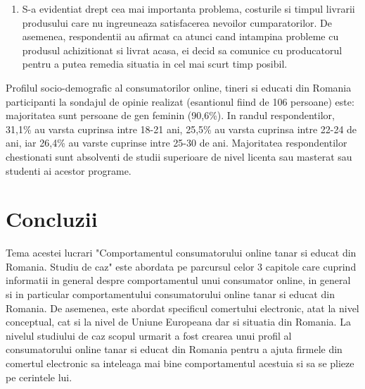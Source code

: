 \documentclass[a4paper, 12pt]{article}
\begin{document}
\begin{enumerate}[1.]
	\item S-a evidentiat drept cea mai importanta problema, costurile si timpul livrarii produsului care nu ingreuneaza satisfacerea nevoilor cumparatorilor. De asemenea, respondentii au afirmat ca atunci cand intampina probleme cu produsul achizitionat si livrat acasa, ei decid sa comunice cu producatorul pentru a putea remedia situatia in cel mai scurt timp posibil.
	\end{enumerate}
	
	\quad Profilul socio-demografic al consumatorilor online, tineri si educati din Romania participanti la sondajul de opinie realizat (esantionul fiind de 106 persoane) este: majoritatea sunt persoane de gen feminin (90,6\%). In randul respondentilor, 31,1\% au varsta cuprinsa intre 18-21 ani, 25,5\% au varsta cuprinsa intre 22-24 de ani, iar 26,4\% au varste cuprinse intre 25-30 de ani. Majoritatea respondentilor chestionati sunt absolventi de studii superioare de nivel licenta sau masterat sau studenti ai acestor programe. 
	
	

	
	\newpage 
	\section*{Concluzii}
	
	\qquad Tema acestei lucrari "Comportamentul consumatorului online tanar si educat din Romania. Studiu de caz" este abordata pe parcursul celor 3 capitole care cuprind informatii in general despre comportamentul unui consumator online, in general si in particular comportamentului consumatorului online tanar si educat din Romania. De asemenea, este abordat specificul comertului electronic, atat la nivel conceptual, cat si la nivel de Uniune Europeana dar si situatia din Romania. La nivelul studiului de caz scopul urmarit a fost crearea unui profil al consumatorului online tanar si educat din Romania pentru a ajuta firmele din comertul electronic sa inteleaga mai bine comportamentul acestuia si sa se plieze pe cerintele lui.
	
\end{document}
